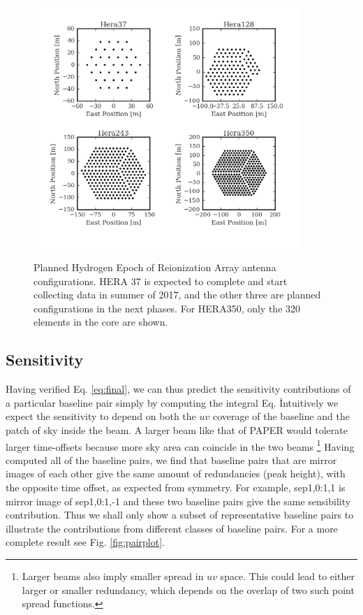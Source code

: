 \documentclass[twocolumn,apj,numberedappendix]{emulateapj}
\renewcommand\[{\begin{equation}}
\renewcommand\]{\end{equation}}
\begin{document}
\begin{figure}[h!]
\includegraphics[width=0.9\textwidth]{HeraAntpos}
\label{fig:HeraAntpos}
\caption{Planned Hydrogen Epoch of Reionization Array antenna configurations. HERA 37 is expected to complete and start collecting data in summer of 2017, and the other three are planned configurations in the next phases. For HERA350, only the 320 elements in the core are shown. }
\end{figure}

\subsection{ Sensitivity \label{sec:sensitivity}}

Having verified Eq. \eqref{eq:final}, we can thus predict the sensitivity contributions of a
particular baseline pair simply by computing the integral Eq. \.
Intuitively we expect the sensitivity to depend on both the $uv$ coverage of the baseline and the patch of sky inside the beam. A larger beam like that of PAPER would tolerate larger time-offsets because more sky area can coincide in the two beams \footnote{Larger beams also imply smaller spread in $uv$ space. This could lead to either larger or smaller redundancy, which depends on the overlap of two such point spread functions.}
Having computed all of the baseline pairs, we find that baseline pairs that are mirror images of each other 
give the same amount of redundancies (peak height), with the opposite time offset, as expected from symmetry. 
For example, sep1,0:1,1 is mirror image of sep1,0:1,-1 and these two baseline pairs
give the same sensibility contribution. Thus we shall only show a subset of representative baseline pairs to illustrate the contributions from different classes of baseline pairs. For a more complete result see Fig. \ref{fig:pairplot}.  
\end{document}
